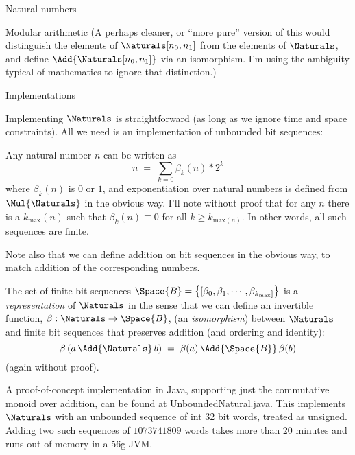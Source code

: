\documentclass[12pt]{PalisadesLakesBook}
\begin{document}
\begin{plSection}{Natural numbers}
\begin{plSection}{Modular arithmetic}
(A perhaps cleaner, or ``more pure'' version of this
would distinguish the elements of $\Naturals[n_0,n_1]$
from the elements of $\Naturals$,
and define $\Add{\Naturals[n_0,n_1]}$ via an isomorphism.
I'm using the ambiguity typical of mathematics to ignore that
distinction.)

\end{plSection}%
\begin{plSection}{Implementations}

Implementing $\Naturals$ is straightforward 
(as long as we ignore time and space constraints).
All we need is an implementation of unbounded bit sequences:

Any natural number $n$ can be written as
\begin{equation}
n \; = \; \sum_{k=0} \beta_{k}(n) * 2^{k}
\end{equation}
where $\beta_{k}(n)$ is $0$ or $1$,
and exponentiation over natural numbers is defined from
$\Mul{\Naturals}$ in the obvious way.
I'll note without proof that for any $n$ there is a 
$k_{\text{max}}(n)$ such that $\beta_{k}(n) \equiv 0$ for all
$k \geq k_{\text{max}(n)}$.
In other words, all such sequences are finite. 

Note also that we can define addition on bit sequences in the
obvious way, to match addition of the corresponding numbers.

The set of finite bit sequences 
$\Space{B} = \left\{[\beta_{0}, \beta_{1}, \cdots, 
\beta_{k_{\text{max}}]} \right\}$
 is a 
\emph{representation} of $\Naturals$
in the sense that we can define an invertible function,
$\beta : \Naturals \rightarrow \Space{B}$,
(an \emph{isomorphism}) between $\Naturals$ and 
finite bit sequences
that preserves addition (and ordering and identity):
\begin{equation}
\beta \left( a \,\Add{\Naturals} \, b\right)
\;=\;
\beta ( a ) \, \Add{\Space{B}} \, \beta ( b )
\end{equation}
(again without proof).

A proof-of-concept implementation in Java,
supporting just the commutative monoid over addition, 
can be found at
\href{https://github.com/palisades-lakes/nzqr/blob/main/src/main/java/nzqr/java/numbers/UnboundedNatural.java}
{\javaFont UnboundedNatural.java}.
This implements $\Naturals$ with an unbounded sequence
of {\javaFont int} 32 bit words, treated as unsigned.
Adding two such sequences of $1073741809$ words
takes more than $20$ minutes and 
runs out of memory in a 56g JVM.


\end{plSection}
\end{plSection}
\end{document}
